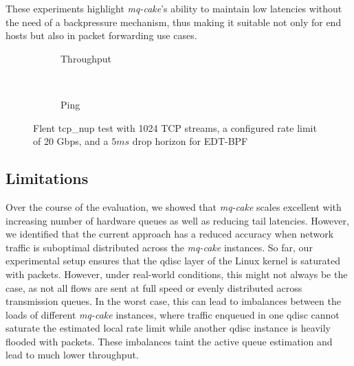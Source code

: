 These experiments highlight \textit{mq-cake}'s ability to maintain low latencies without the need of a backpressure mechanism, thus making it suitable not only for end hosts but also in packet forwarding use cases. 
\begin{figure}
    \centering
    \hspace{-0.25cm}
    \begin{subfigure}{\linewidth}
        \centering
        
        \caption{Throughput}\label{fig:flent_tp_5ms}
    \end{subfigure}
    \\
    \begin{subfigure}{\linewidth}
        \centering
        
        \caption{Ping}\label{fig:flent_ping_5ms}
    \end{subfigure}
    \caption{Flent tcp\_nup test with 1024 TCP streams, a configured rate limit of 20 Gbps, and a $5ms$ drop horizon for EDT-BPF}\label{fig:flent_5ms}
\end{figure}

\subsection{Limitations}
Over the course of the evaluation, we showed that \textit{mq-cake} scales excellent with increasing number of hardware queues as well as reducing tail latencies.
However, we identified that the current approach has a reduced accuracy when network traffic is suboptimal distributed across the \textit{mq-cake} instances.
So far, our experimental setup ensures that the qdisc layer of the Linux kernel is saturated with packets.
%
However, under real-world conditions, this might not always be the case, as not all flows are sent at full speed or evenly distributed across transmission queues.
%
In the worst case, this can lead to imbalances between the loads of different \textit{mq-cake} instances, where traffic enqueued in one qdisc cannot saturate the estimated local rate limit while another qdisc instance is heavily flooded with packets.
%
These imbalances taint the active queue estimation and lead to much lower throughput.
%

